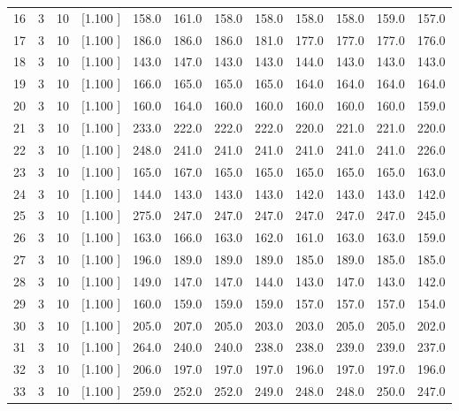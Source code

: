 \documentclass[12pt,a4paper]{article}
\begin{document}
\begin{center}
{\begin{tabular}{r r r r r r r r r r r r}
  16&  3& 10&[1.100     ]&   158.0&   161.0&   158.0&   158.0&   158.0&   158.0&   159.0&   157.0\\[-0.02in]
  17&  3& 10&[1.100     ]&   186.0&   186.0&   186.0&   181.0&   177.0&   177.0&   177.0&   176.0\\[-0.02in]
  18&  3& 10&[1.100     ]&   143.0&   147.0&   143.0&   143.0&   144.0&   143.0&   143.0&   143.0\\[-0.02in]
  19&  3& 10&[1.100     ]&   166.0&   165.0&   165.0&   165.0&   164.0&   164.0&   164.0&   164.0\\[-0.02in]
  20&  3& 10&[1.100     ]&   160.0&   164.0&   160.0&   160.0&   160.0&   160.0&   160.0&   159.0\\[-0.02in]
  21&  3& 10&[1.100     ]&   233.0&   222.0&   222.0&   222.0&   220.0&   221.0&   221.0&   220.0\\[-0.02in]
  22&  3& 10&[1.100     ]&   248.0&   241.0&   241.0&   241.0&   241.0&   241.0&   241.0&   226.0\\[-0.02in]
  23&  3& 10&[1.100     ]&   165.0&   167.0&   165.0&   165.0&   165.0&   165.0&   165.0&   163.0\\[-0.02in]
  24&  3& 10&[1.100     ]&   144.0&   143.0&   143.0&   143.0&   142.0&   143.0&   143.0&   142.0\\[-0.02in]
  25&  3& 10&[1.100     ]&   275.0&   247.0&   247.0&   247.0&   247.0&   247.0&   247.0&   245.0\\[-0.02in]
  26&  3& 10&[1.100     ]&   163.0&   166.0&   163.0&   162.0&   161.0&   163.0&   163.0&   159.0\\[-0.02in]
  27&  3& 10&[1.100     ]&   196.0&   189.0&   189.0&   189.0&   185.0&   189.0&   185.0&   185.0\\[-0.02in]
  28&  3& 10&[1.100     ]&   149.0&   147.0&   147.0&   144.0&   143.0&   147.0&   143.0&   142.0\\[-0.02in]
  29&  3& 10&[1.100     ]&   160.0&   159.0&   159.0&   159.0&   157.0&   157.0&   157.0&   154.0\\[-0.02in]
  30&  3& 10&[1.100     ]&   205.0&   207.0&   205.0&   203.0&   203.0&   205.0&   205.0&   202.0\\[-0.02in]
  31&  3& 10&[1.100     ]&   264.0&   240.0&   240.0&   238.0&   238.0&   239.0&   239.0&   237.0\\[-0.02in]
  32&  3& 10&[1.100     ]&   206.0&   197.0&   197.0&   197.0&   196.0&   197.0&   197.0&   196.0\\[-0.02in]
  33&  3& 10&[1.100     ]&   259.0&   252.0&   252.0&   249.0&   248.0&   248.0&   250.0&   247.0\\[-0.02in]

\end{tabular}}
\end{center}
\end{document}
